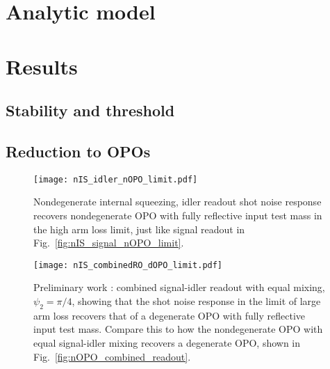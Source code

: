 \section{Analytic model}



\section{Results}

\subsection{Stability and threshold}



\subsection{Reduction to OPOs}


\begin{figure}
	\centering
	\texttt{[image: nIS\_idler\_nOPO\_limit.pdf]}
	\caption{  Nondegenerate internal squeezing, idler readout shot noise response recovers nondegenerate OPO with fully reflective input test mass in the high arm loss limit, just like signal readout in Fig.~\ref{fig:nIS_signal_nOPO_limit}.}
	\label{fig:}
\end{figure}

\begin{figure}
	\centering
	\texttt{[image: nIS\_combinedRO\_dOPO\_limit.pdf]}
	\caption{  Preliminary work : combined signal-idler readout with equal mixing, $\psi_2=\pi/4$, showing that the shot noise response in the limit of large arm loss recovers that of a degenerate OPO with fully reflective input test mass. Compare this to how the nondegenerate OPO with equal signal-idler mixing recovers a degenerate OPO, shown in Fig.~\ref{fig:nOPO_combined_readout}.}
	\label{fig:}
\end{figure}

